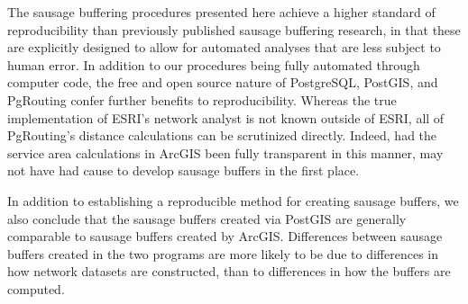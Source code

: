\documentclass[11pt,letterpaper]{article} %
\begin{document}
The sausage buffering procedures presented here achieve a higher
standard of reproducibility than previously published sausage
buffering research, in that these are explicitly designed to allow for
automated analyses that are less subject to human error. In addition
to our procedures being fully automated through computer code, the
free and open source nature of PostgreSQL, PostGIS, and PgRouting
confer further benefits to reproducibility. Whereas the true
implementation of ESRI's network analyst is not known outside of ESRI,
all of PgRouting's distance calculations can be scrutinized
directly. Indeed, had the service area calculations in ArcGIS been
fully transparent in this manner, \citeauthor{Forsyth2014sausage} may
not have had cause to develop sausage buffers in the first place.

In addition to establishing a reproducible method for creating sausage
buffers, we also conclude that the sausage buffers created via PostGIS
are generally comparable to sausage buffers created by
ArcGIS. Differences between sausage buffers created in the two
programs are more likely to be due to differences in how network
datasets are constructed, than to differences in how the buffers are
computed.

\printbibliography
\end{document}
